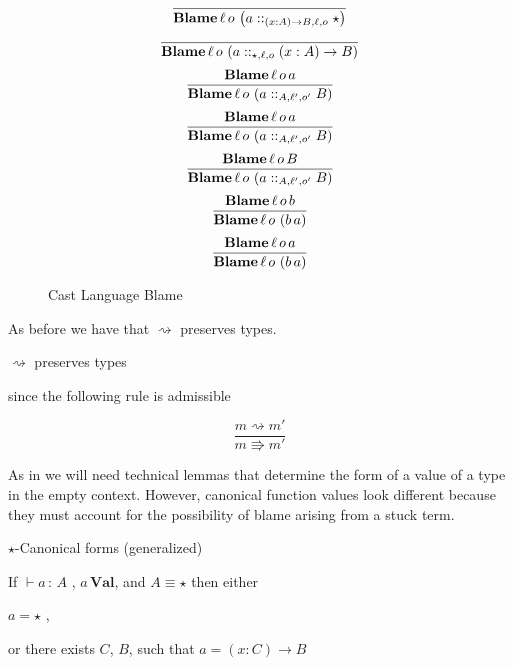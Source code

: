 \begin{figure}
\[
\frac{\,}{\blame{\left(a::_{\left(x:A\right)\rightarrow B,\ell ,o}\star\right)}{\ell}{o}}
\]
\[
\frac{\,}{\blame{\left(a::_{\star,\ell ,o}\left(x:A\right)\rightarrow B\right)}{\ell}{o}}
\]
\[
\frac{ 
  \blame{a}{\ell}{o} 
}{
  \blame{\left(a::_{A,\ell',o'}B\right)}{\ell}{o} 
}
\]
\[
\frac{
  \blame{a}{\ell}{o} 
}{
  \blame{\left(a::_{A,\ell',o'}B\right)}{\ell}{o} 
}
\]
\[
\frac{
  \blame{B}{\ell}{o} 
}{
  \blame{\left(a::_{A,\ell',o'}B\right)}{\ell}{o} 
}
\]
\[
\frac{
  \blame{b}{\ell}{o}
}{
  \blame{\left(b\,a\right)}{\ell}{o}
}
\]
\[
\frac{
  \blame{a}{\ell}{o}
}{
  \blame{\left(b\,a\right)}{\ell}{o}
}
\]
\caption{Cast Language Blame}
\label{fig:cast-blame}
\end{figure}

As before we have that $\rightsquigarrow$ preserves types.

\begin{fact}
$\rightsquigarrow$ preserves types 

since the following rule is admissible
\end{fact}

\[
\frac{m\rightsquigarrow m'}{m\Rrightarrow m'}
\]

As in  we will need technical lemmas that determine the form of a value of a type in the empty context.
However, canonical function values look different because they must account for the possibility of blame arising from a stuck term.
\begin{lem}
$\star$-Canonical forms (generalized)

If $\vdash a\,:\,A$ , $a\,\textbf{Val}$, and $A\equiv\star$ then
either

\textup{$a=\star$ ,}

\textup{or there exists $C$, $B$, such that $a=\left(x:C\right)\rightarrow B$}
\end{lem}

